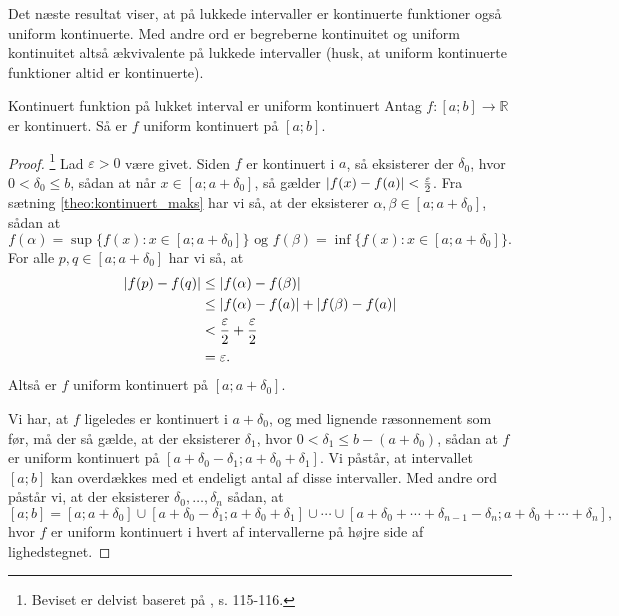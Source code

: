 Det næste resultat viser, at på lukkede intervaller er kontinuerte funktioner også uniform kontinuerte.
Med andre ord er begreberne kontinuitet og uniform kontinuitet altså ækvivalente på lukkede intervaller (husk, at uniform kontinuerte funktioner altid er kontinuerte).

\begin{theorem}[label=theo:kontinuert_uniform]{Kontinuert funktion på lukket interval er uniform kontinuert}{}
  Antag $f:[a;b]\to \mathbb{R}$ er kontinuert. 
  Så er $f$ uniform kontinuert på $[a;b]$.
\end{theorem}
\begin{proof} 
  \footnote{Beviset er delvist baseret på \cite{Clausen1993}, s. 115-116.} 
Lad $\varepsilon >0$ være givet. 
  Siden $f$ er kontinuert i $a$, så eksisterer der $\delta_0$, hvor $0<\delta_0 \leq b$, sådan at når $x \in [a;a+\delta_0 ]$, så gælder $\abs{f(x)-f(a)} < \frac{\varepsilon }{2} $.
  Fra sætning \ref{theo:kontinuert_maks} har vi så, at der eksisterer $\alpha , \beta \in [a;a+\delta_0 ]$, sådan at
  \[
  f(\alpha )=\sup \{ f(x):x \in [a;a+\delta_0 ] \} \text{ og } f(\beta )= \inf \{ f(x):x \in [a;a+\delta_0 ] \}.
  \] 
  For alle $p, q \in [a;a+\delta_0 ]$ har vi så, at
  \begin{equation*}
  \begin{split}
    \abs{f(p)-f(q)} &\leq \abs{f(\alpha )-f(\beta )} \\
    &\leq \abs{f(\alpha )-f(a)} + \abs{f(\beta ) - f(a)} \\
    &<\frac{\varepsilon }{2} + \frac{\varepsilon }{2}\\
    &=\varepsilon.
  \end{split}
  \end{equation*}
  Altså er $f$ uniform kontinuert på $[a;a+\delta_0 ]$.

  Vi har, at $f$ ligeledes er kontinuert i $a + \delta _0$, og med lignende ræsonnement som før, må der så gælde, at der eksisterer $\delta _1$, hvor $0<\delta _1 \leq b-(a+\delta _0)$, sådan at $f$ er uniform kontinuert på $[a+\delta _0-\delta_1;a+\delta_0 + \delta_1]$. 
  Vi påstår, at intervallet $[a;b]$ kan overdækkes med et endeligt antal af disse intervaller. 
  Med andre ord påstår vi, at der eksisterer $\delta _0, \ldots , \delta _n$ sådan, at 
  \[
  [a;b]=[a;a+\delta_0 ] \cup [a+\delta _0-\delta_1;a+\delta_0 + \delta_1] \cup \cdots \cup [a+\delta _0+\cdots +\delta _{n-1}-\delta _n;a+\delta _0+\cdots +\delta _{n}],
  \] 
  hvor $f$ er uniform kontinuert i hvert af intervallerne på højre side af lighedstegnet. 


\end{proof}
